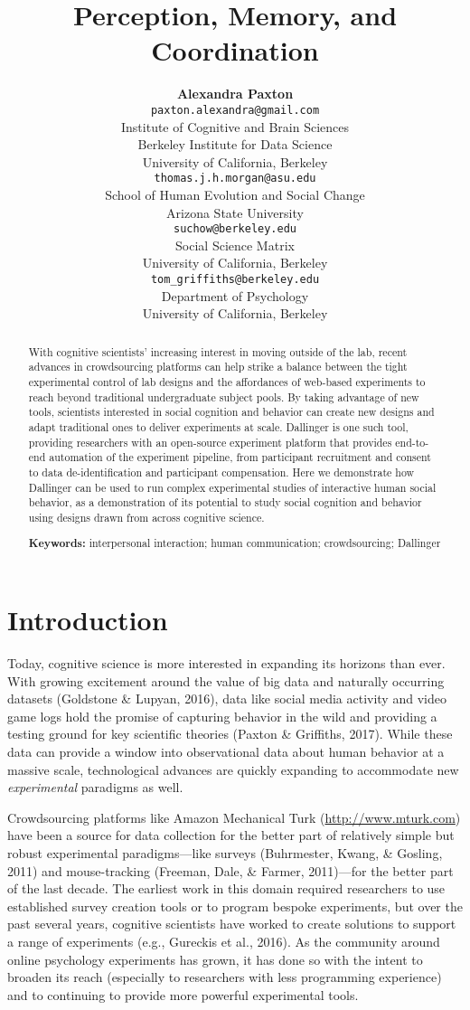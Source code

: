 \documentclass[10pt, letterpaper]{article}
\title{Perception, Memory, and Coordination}
\author{{\large \bf Alexandra Paxton} \\ \texttt{paxton.alexandra@gmail.com} \\ Institute of Cognitive and Brain Sciences \\ Berkeley Institute for Data Science \\ University of California, Berkeley \And {\large \bf Thomas J. H. Morgan} \\ \texttt{thomas.j.h.morgan@asu.edu} \\ School of Human Evolution and Social Change \\ Arizona State University \AND {\large \bf Jordan W. Suchow} \\ \texttt{suchow@berkeley.edu} \\ Social Science Matrix \\ University of California, Berkeley \And {\large \bf Thomas L. Griffiths} \\ \texttt{tom\_griffiths@berkeley.edu} \\ Department of Psychology \\ University of California, Berkeley}
\begin{document}
\maketitle

\begin{abstract}
With cognitive scientists' increasing interest in moving outside of the
lab, recent advances in crowdsourcing platforms can help strike a
balance between the tight experimental control of lab designs and the
affordances of web-based experiments to reach beyond traditional
undergraduate subject pools. By taking advantage of new tools,
scientists interested in social cognition and behavior can create new
designs and adapt traditional ones to deliver experiments at scale.
Dallinger is one such tool, providing researchers with an open-source
experiment platform that provides end-to-end automation of the
experiment pipeline, from participant recruitment and consent to data
de-identification and participant compensation. Here we demonstrate how
Dallinger can be used to run complex experimental studies of interactive
human social behavior, as a demonstration of its potential to study
social cognition and behavior using designs drawn from across cognitive
science.

\textbf{Keywords:}
interpersonal interaction; human communication; crowdsourcing; Dallinger
\end{abstract}

\section{Introduction}\label{introduction}

Today, cognitive science is more interested in expanding its horizons
than ever. With growing excitement around the value of big data and
naturally occurring datasets (Goldstone \& Lupyan, 2016), data like
social media activity and video game logs hold the promise of capturing
behavior in the wild and providing a testing ground for key scientific
theories (Paxton \& Griffiths, 2017). While these data can provide a
window into observational data about human behavior at a massive scale,
technological advances are quickly expanding to accommodate new
\emph{experimental} paradigms as well.

Crowdsourcing platforms like Amazon Mechanical Turk
(\url{http://www.mturk.com}) have been a source for data collection for
the better part of relatively simple but robust experimental
paradigms---like surveys (Buhrmester, Kwang, \& Gosling, 2011) and
mouse-tracking (Freeman, Dale, \& Farmer, 2011)---for the better part of
the last decade. The earliest work in this domain required researchers
to use established survey creation tools or to program bespoke
experiments, but over the past several years, cognitive scientists have
worked to create solutions to support a range of experiments (e.g.,
Gureckis et al., 2016). As the community around online psychology
experiments has grown, it has done so with the intent to broaden its
reach (especially to researchers with less programming experience) and
to continuing to provide more powerful experimental tools.
\end{document}

